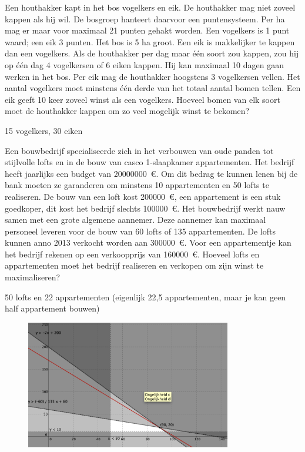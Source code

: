 \begin{oef}
Een houthakker kapt in het bos vogelkers en eik. 
De houthakker mag niet zoveel kappen als hij wil. De bosgroep hanteert
daarvoor een puntensysteem. Per ha mag er maar voor maximaal 21 punten
gehakt worden. Een vogelkers is 1 punt waard; een eik 3 punten.
Het bos is 5 ha groot.
Een eik is makkelijker te kappen dan een vogelkers. Als de houthakker per dag maar 
\'e\'en soort zou kappen, zou hij op \'e\'en dag 4 vogelkersen of 6 eiken kappen. 
Hij kan maximaal 10 dagen gaan werken in het bos.
Per eik mag de houthakker hoogstens 3 vogelkersen vellen.
Het aantal vogelkers moet minstens \'e\'en derde van het totaal aantal bomen
tellen.
Een eik geeft 10 keer zoveel winst als een vogelkers. Hoeveel bomen van elk soort
moet de houthakker kappen om zo veel mogelijk winst te bekomen? 
\begin{opl}
15 vogelkers, 30 eiken
\end{opl}
\end{oef}

\begin{oef}    
Een bouwbedrijf specialiseerde zich in het verbouwen van oude panden tot stijlvolle lofts en in de bouw van casco 1-slaapkamer appartementen. Het bedrijf heeft jaarlijks een budget van \SI{20000000}{\euro}. Om dit bedrag te kunnen lenen bij de bank moeten ze garanderen om minstens 10 appartementen en 50 lofts te realiseren. De bouw van een loft kost \SI{200000}{\euro}, een appartement is een stuk goedkoper, dit kost het bedrijf slechts \SI{100000}{\euro}. Het bouwbedrijf werkt nauw samen met een grote algemene aannemer. Deze aannemer kan maximaal personeel leveren voor de bouw van 60 lofts of 135 appartementen. De lofts kunnen anno 2013 verkocht worden aan \SI{300000}{\euro}. Voor een appartementje kan het bedrijf rekenen op een verkoopprijs van \SI{160000}{\euro}. Hoeveel lofts en appartementen moet het bedrijf realiseren en verkopen om zijn winst te maximaliseren?
\begin{opl}
50 lofts en 22 appartementen (eigenlijk 22,5 appartementen, maar je kan geen half appartement bouwen)
\begin{figure}[htb]
\centering
\includegraphics[width=0.8\textwidth]{oefeningen/FigurenLP/lofts}
\end{figure}
\end{opl}
\end{oef}



%

